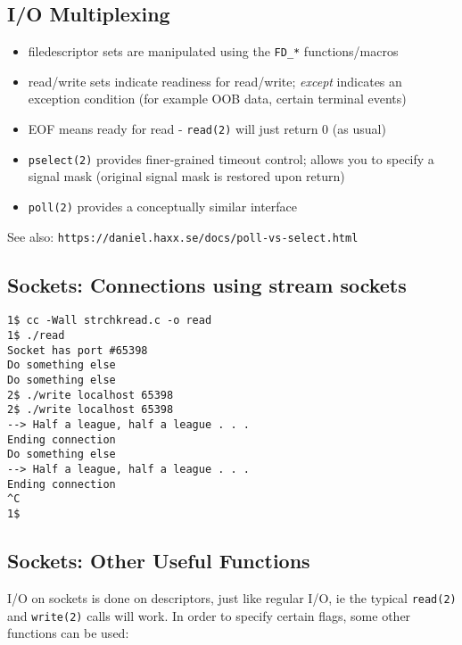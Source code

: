 \documentclass[xga]{xdvislides}
\begin{document}
\subsection{I/O Multiplexing}
\begin{itemize}
	\item filedescriptor sets are manipulated using the {\tt FD\_*} functions/macros
	\item read/write sets indicate readiness for read/write; {\em except} indicates an exception condition (for example OOB data, certain terminal events)
	\item EOF means ready for read - {\tt read(2)} will just return 0 (as usual)
	\item {\tt pselect(2)} provides finer-grained timeout control;
allows you to specify a signal mask (original signal mask is restored
upon return)
	\item {\tt poll(2)} provides a conceptually similar interface
\end{itemize}
\vspace{.5in}
See also: \verb+https://daniel.haxx.se/docs/poll-vs-select.html+

\subsection{Sockets: Connections using stream sockets}
\begin{verbatim}
1$ cc -Wall strchkread.c -o read
1$ ./read
Socket has port #65398
Do something else
Do something else
2$ ./write localhost 65398
2$ ./write localhost 65398
‐-> Half a league, half a league . . .
Ending connection
Do something else
--> Half a league, half a league . . .
Ending connection
^C
1$
\end{verbatim}
\vfill


\subsection{Sockets: Other Useful Functions}

I/O on sockets is done on descriptors, just like regular I/O, ie the typical
{\tt read(2)} and {\tt write(2)} calls will work.  In order to specify certain
flags, some other functions can be used:
\end{document}

